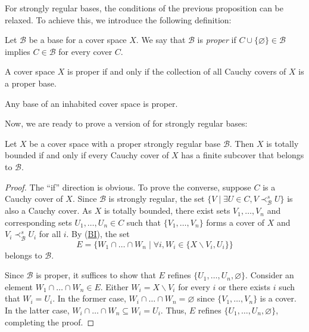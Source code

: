 \documentclass[reqno]{amsart}
\newcommand{\axref}[1]{(\hyperref[ax:#1]{#1})}
\theoremstyle{definition}
\theoremstyle{remark}
\numberwithin{figure}{section}
\newcommand{\rb}{\prec}
\begin{document}
For strongly regular bases, the conditions of the previous proposition can be relaxed.
To achieve this, we introduce the following definition:

\begin{defn}
Let $\mathcal{B}$ be a base for a cover space $X$.
We say that $\mathcal{B}$ is \emph{proper} if $C \cup \{ \varnothing \} \in \mathcal{B}$ implies $C \in \mathcal{B}$ for every cover $C$.
\end{defn}

\begin{example}
A cover space $X$ is proper if and only if the collection of all Cauchy covers of $X$ is a proper base.
\end{example}

\begin{example}
Any base of an inhabited cover space is proper.
\end{example}

Now, we are ready to prove a version of  for strongly regular bases:

\begin{prop}
Let $X$ be a cover space with a proper strongly regular base $\mathcal{B}$.
Then $X$ is totally bounded if and only if every Cauchy cover of $X$ has a finite subcover that belongs to $\mathcal{B}$.
\end{prop}
\begin{proof}
The ``if'' direction is obvious.
To prove the converse, suppose $C$ is a Cauchy cover of $X$.
Since $\mathcal{B}$ is strongly regular, the set $\{ V \mid \exists U \in C, V \rb^s_\mathcal{B} U \}$ is also a Cauchy cover.
As $X$ is totally bounded, there exist sets $V_1, \ldots, V_n$ and corresponding sets $U_1, \ldots, U_n \in C$ such that $\{ V_1, \ldots, V_n \}$ forms a cover of $X$ and $V_i \rb^s_\mathcal{B} U_i$ for all $i$.
By \axref{BI}, the set
\[ E = \{ W_1 \cap \ldots \cap W_n \mid \forall i, W_i \in \{ X \backslash V_i, U_i \} \} \]
belongs to $\mathcal{B}$.

Since $\mathcal{B}$ is proper, it suffices to show that $E$ refines $\{ U_1, \ldots, U_n, \varnothing \}$.
Consider an element $W_1 \cap \ldots \cap W_n \in E$.
Either $W_i = X \backslash V_i$ for every $i$ or there exists $i$ such that $W_i = U_i$.
In the former case, $W_i \cap \ldots \cap W_n = \varnothing$ since $\{ V_1, \ldots, V_n \}$ is a cover.
In the latter case, $W_i \cap \ldots \cap W_n \subseteq W_i = U_i$.
Thus, $E$ refines $\{ U_1, \ldots, U_n, \varnothing \}$, completing the proof.
\end{proof}
\end{document}
